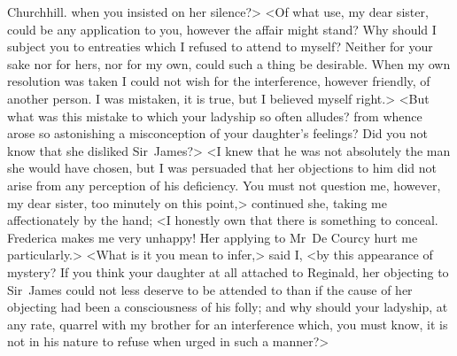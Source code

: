 \begin{mail}{Churchhill.}{}
when you insisted on her silence?> <Of what use, my dear sister, could be any application to you, however the affair might stand? Why should I subject you to entreaties which I refused to attend to myself? Neither for your sake nor for hers, nor for my own, could such a thing be desirable. When my own resolution was taken I could not wish for the interference, however friendly, of another person. I was mistaken, it is true, but I believed myself right.> <But what was this mistake to which your ladyship so often alludes? from whence arose so astonishing a misconception of your daughter's feelings? Did you not know that she disliked Sir~James?> <I knew that he was not absolutely the man she would have chosen, but I was persuaded that her objections to him did not arise from any perception of his deficiency. You must not question me, however, my dear sister, too minutely on this point,> continued she, taking me affectionately by the hand; <I honestly own that there is something to conceal. Frederica makes me very unhappy! Her applying to Mr~De Courcy hurt me particularly.> <What is it you mean to infer,> said I, <by this appearance of mystery? If you think your daughter at all attached to Reginald, her objecting to Sir~James could not less deserve to be attended to than if the cause of her objecting had been a consciousness of his folly; and why should your ladyship, at any rate, quarrel with my brother for an interference which, you must know, it is not in his nature to refuse when urged in such a manner?>


\end{mail}
